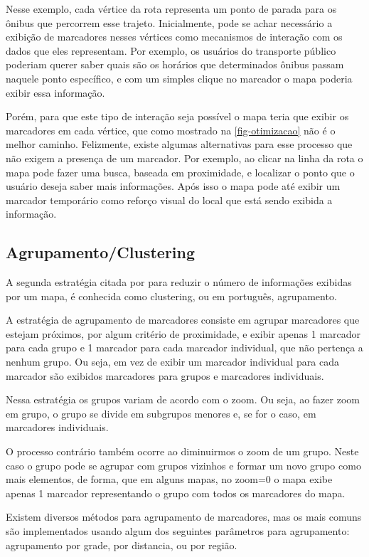 	Nesse exemplo, cada vértice da rota representa um ponto de parada para os ônibus que percorrem esse trajeto. Inicialmente, pode se achar necessário a exibição de marcadores nesses vértices como mecanismos de interação com os dados que eles representam. Por exemplo, os usuários do transporte público poderiam querer saber quais são os horários que determinados ônibus passam naquele ponto específico, e com um simples clique no marcador o mapa poderia exibir essa informação. 
	
	Porém, para que este tipo de interação seja possível o mapa teria que exibir os marcadores em cada vértice, que como mostrado na \autoref{fig-otimizacao} não é o melhor caminho. Felizmente, existe algumas alternativas para esse processo que não exigem a presença de um marcador. Por exemplo, ao clicar na linha da rota o mapa pode fazer uma busca, baseada em proximidade, e localizar o ponto que o usuário deseja saber mais informações. Após isso o mapa pode até exibir um marcador temporário como reforço visual do local que está sendo exibida a informação.
	

  \subsection{Agrupamento/Clustering\label{secagrupamento}}
  A segunda estratégia citada por \cite[capítulo~9]{livroGoogleApiV3} para reduzir o número de informações exibidas por um mapa, é conhecida como clustering, ou em português, agrupamento.
  
  A estratégia de agrupamento de marcadores consiste em agrupar marcadores que estejam próximos, por algum critério de proximidade, e exibir apenas 1 marcador para cada grupo e 1 marcador para cada marcador individual, que não pertença a nenhum grupo. Ou seja, em vez de exibir um marcador individual para cada marcador são exibidos marcadores para grupos e marcadores individuais. 
  
  Nessa estratégia os grupos variam de acordo com o zoom. Ou seja, ao fazer zoom em grupo, o grupo se divide em subgrupos menores e, se for o caso, em marcadores individuais.
  
   O processo contrário também ocorre ao diminuirmos o zoom de um grupo. Neste caso o grupo pode se agrupar com grupos vizinhos e formar um novo grupo como mais elementos, de forma, que em alguns mapas, no zoom=0 o mapa exibe apenas 1 marcador representando o grupo com todos os marcadores do mapa.

   Existem diversos métodos para agrupamento de marcadores, mas os mais comuns são implementados usando algum dos seguintes parâmetros para agrupamento: agrupamento por grade, por distancia, ou por região.
     
